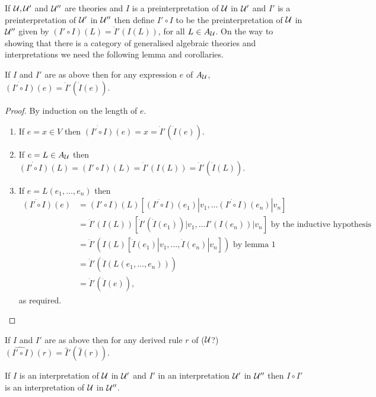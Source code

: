 If $\mathcal{U},\mathcal{U}'$ and $\mathcal{U}''$ are theories and $I$ is a preinterpretation of $\mathcal{U}$ in $\mathcal{U}'$ and $I'$ is a preinterpretation of $\mathcal{U}'$ in $\mathcal{U}''$ then define $I'\circ I$ to be the preinterpretation of $\mathcal{U}$ in $\mathcal{U}''$ given by $(I'\circ I)(L) = \dot I'(I(L))$, for all $L\in A_{\mathcal{U}}$.
%
On the way to showing that there is a category of generalised algebraic theories and interpretations we need the following lemma and corollaries.

\begin{lemma}[3]
If $I$ and $I'$ are as above then for any expression $e$ of $A_{\mathcal{U}}$, $\dot{(I'\circ I)}(e) = \dot I'(\dot I(e)).$
\end{lemma}
\begin{proof}
By induction on the length of $e$.
\begin{enumerate}
\item If $e = x\in V$ then $\dot{(I'\circ I)}(e)= x = \dot I'(\dot I(e)).$
\item If $e=L\in A_{\mathcal{U}}$ then $\dot{(I'\circ I)}(L) = (I'\circ I)(L) = \dot I'(I(L)) = \dot I'(\dot I(L)).$
\item If $e = L(e_1,\ldots,e_n)$ then 
\begin{align*}
\dot{(I'\circ I)}(e) &= (I'\circ I)(L)[\dot{(I'\circ I)}(e_1)|v_1,\ldots\dot{(I'\circ I)}(e_n)|v_n] \\
                     &= \dot I'(I(L))[\dot I'(\dot I(e_1))|v_1,\ldots I'(I(e_n))|v_n] \text{ by the inductive hypothesis}\\
                     &=\dot I'(I(L)[\dot I(e_1)|v_1,\ldots,\dot I(e_n)|v_n]) \text{ by lemma 1}\\
                     &=\dot I'(\dot I(L(e_1,\ldots,e_n)))\\
                     &=\dot I'(\dot I(e)),
\end{align*}
 as required.
\end{enumerate}
\end{proof}

\begin{corollary}[4]
If $I$ and $I'$ are as above then for any derived rule $r$ of ($\mathcal{U}$?)  $\widehat{(I'\circ I)}(r) = \hat I'(\hat I(r)).$
\end{corollary}

\begin{corollary}[5]
If $I$ is an interpretation of $\mathcal{U}$ in $\mathcal{U}'$ and $I'$ in an interpretation $\mathcal{U}'$ in $\mathcal{U}''$ then $I\circ I'$ is an interpretation of $\mathcal{U}$ in $\mathcal{U}''$.
\end{corollary}

